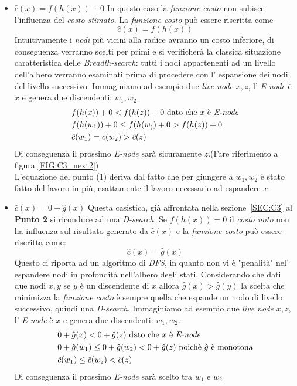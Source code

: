 \documentclass[a4paper]{article}
\begin{document}
\begin{itemize}
	\item $\hat c(x) = f(h(x)) + 0$ In questo caso la \textit{funzione costo} non subisce l'influenza del \textit{costo stimato}.
		La \textit{funzione costo} può essere riscritta come $$\hat c(x) = f(h(x))$$
		Intuitivamente i \textit{nodi} più vicini alla radice avranno un costo inferiore, di conseguenza verranno scelti per primi e si verificherà la classica situazione caratteristica delle \textit{Breadth-search}: tutti i nodi appartenenti ad un livello dell'albero verranno esaminati prima di procedere con l' espansione dei nodi del livello successivo.
Immaginiamo ad esempio due \textit{live node} $x,z$, l' \textit{E-node} è $x$ e genera due discendenti: $w_1, w_2$.
                \begin{align}
                        &f(h(x)) + 0 < f(h(z)) + 0 \text{ dato che $x$ è \textit{E-node}} \notag \\
                        &f(h(w_1)) + 0 \leq f(h(w_)) + 0 > f(h(z)) + 0 \\
                        &\hat c(w_1) = c(w_2) > \hat c(z) \notag
                \end{align}
		Di conseguenza il prossimo \textit{E-node} sarà sicuramente $z$.(Fare riferimento a figura \ref{FIG:C3_next2})\\
L'equazione del punto (1) deriva dal fatto che per giungere a $w_1,w_2$ è stato fatto del lavoro in più, esattamente il lavoro necessario ad espandere $x$

	\item $\hat c(x) = 0 + \hat g(x)$ Questa casistica, già affrontata nella sezione~\ref{SEC:C3} al \textbf{Punto 2} si riconduce ad una \textit{D-search}.
		Se $f(h(x)) =0$ il \textit{costo noto} non ha influenza sul risultato generato da $\hat c(x)$ e la \textit{funzione costo} può essere riscritta come: $$\hat c(x) = \hat g(x)$$
Questo ci riporta ad un algoritmo di \textit{DFS}, in quanto non vi è "penalità" nel' espandere nodi in profondità nell'albero degli stati.
Considerando che dati due nodi $x,y$ se $y$ è un discendente di $x$ allora $\hat g(x) > \hat g(y)$ la scelta che minimizza la \textit{funzione costo} è sempre quella che espande un nodo di livello successivo, quindi una \textit{D-search}.
Immaginiamo ad esempio due \textit{live node} $x,z$, l' \textit{E-node} è $x$ e genera due discendenti: $w_1, w_2$.
                \begin{align}
                        &0 + \hat g(x) < 0 + \hat g(z) \text{ dato che $x$ è \textit{E-node}} \notag \\
                        &0 + \hat g(w_1) \leq 0 + \hat g(w_2) < 0 + \hat g(z) \text{ poichè $\hat g$ è monotona} \notag\\
                        &\hat c(w_1) \leq \hat c(w_2) < \hat c(z) \notag
                \end{align}
Di conseguenza il prossimo \textit{E-node} sarà scelto tra $w_1$ e $w_2$

\end{itemize}
\end{document}
